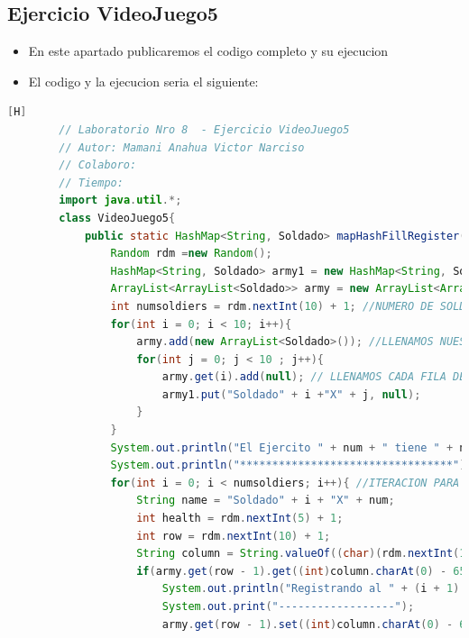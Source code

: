 \documentclass{article}
\begin{document}
	\subsection{Ejercicio VideoJuego5}
	\begin{itemize}	
		\item En este apartado publicaremos el codigo completo y su ejecucion
		\item El codigo y la ejecucion seria el siguiente:
	\end{itemize}		
	\begin{lstlisting}[language=java,caption={Las lineas de codigos del metodo creado:}][H]
		// Laboratorio Nro 8  - Ejercicio VideoJuego5
		// Autor: Mamani Anahua Victor Narciso
		// Colaboro:
		// Tiempo:
		import java.util.*;
		class VideoJuego5{
			public static HashMap<String, Soldado> mapHashFillRegister(int num){
				Random rdm =new Random();
				HashMap<String, Soldado> army1 = new HashMap<String, Soldado>();
				ArrayList<ArrayList<Soldado>> army = new ArrayList<ArrayList<Soldado>>(); //NOS AYUDARIAMOS DE UN ARRAYLIST PARA PODER AYUDARNOS CON EL USO DE HASHMAPS PARA PODER REGISTAR A SOLDADOS EN LA QUE NINGUNO DE ESTOS SE REPITA 
				int numsoldiers = rdm.nextInt(10) + 1; //NUMERO DE SOLDADOS QUE SE VAN A CREAR DE 1 AL 10 
				for(int i = 0; i < 10; i++){
					army.add(new ArrayList<Soldado>()); //LLENAMOS NUESTROS ARRAYLIST BIDIMENSIONAL CON CADA FILA PARA QUE CUMPLAN CON ESTRUCTURA DEL TABLERO
					for(int j = 0; j < 10 ; j++){
						army.get(i).add(null); // LLENAMOS CADA FILA DEL ARRAYLIST CON UN OBJETO SOLDADO CON TAL QUE ESTE SEA NULL PARA QUE SEPA QUE ESTE TIENE UNA CASILLA PERO NO HAY NADIE TODAVIA SE PUEDE LLENAR 
						army1.put("Soldado" + i +"X" + j, null);
					}
				}
				System.out.println("El Ejercito " + num + " tiene " + numsoldiers + " soldados : " ); 
				System.out.println("*********************************");
				for(int i = 0; i < numsoldiers; i++){ //ITERACION PARA PODER DARLES LOS DATOS A CADA SOLDADO CREADO 
					String name = "Soldado" + i + "X" + num;
					int health = rdm.nextInt(5) + 1;
					int row = rdm.nextInt(10) + 1;
					String column = String.valueOf((char)(rdm.nextInt(10) + 65)); //REUTILIZAMOS CODIGO DEL ANTERIOR ARCHIVO VIDEOJUEGO4.JAVA YA QUE TENDRIAN LA MISMA FUNCIONALIDAD
					if(army.get(row - 1).get((int)column.charAt(0) - 65) == null){ 
						System.out.println("Registrando al " + (i + 1) + " soldado del Ejercito " + num + "");
						System.out.print("------------------");
						army.get(row - 1).set((int)column.charAt(0) - 65, new Soldado(name, health, row, column));

\end{lstlisting}
\end{document}
